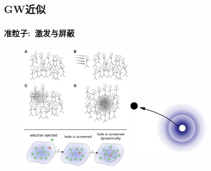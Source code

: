 {\subsection{\rm{GW}近似}
\frame
{
	\frametitle{准粒子:~激发与屏蔽}
\begin{figure}[h!]
	\vspace{-0.12in}
\centering
\includegraphics[height=2.65in,width=2.25in,viewport=0 0 510 575,clip]{Figures/DFT_GW-2.jpg}
\includegraphics[height=1.80in,width=1.65in,viewport=0 0 455 525,clip]{Figures/DFT_GW-electron.jpg}
\label{Green's_function-quasi-particle}
\end{figure}
}

}
